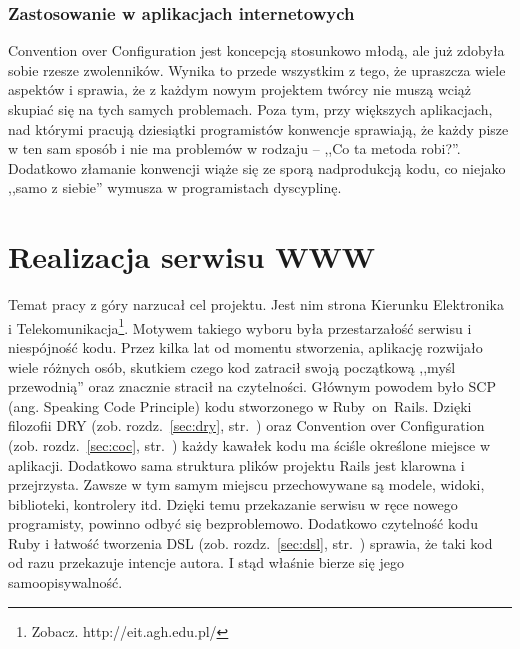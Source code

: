 \documentclass[a4paper,12pt,oneside]{report}
\begin{document}
\subsection{Zastosowanie w aplikacjach internetowych}
\label{coc:web}
Convention over Configuration jest koncepcją stosunkowo młodą, ale już zdobyła sobie rzesze zwolenników. Wynika to przede wszystkim z tego, że upraszcza wiele aspektów i sprawia, że z każdym nowym projektem twórcy nie muszą wciąż skupiać się na tych samych problemach. Poza tym, przy większych aplikacjach, nad którymi pracują dziesiątki programistów konwencje sprawiają, że każdy pisze w ten sam sposób i nie ma problemów w rodzaju -- ,,Co ta metoda robi?''. Dodatkowo złamanie konwencji wiąże się ze sporą nadprodukcją kodu, co niejako ,,samo z siebie'' wymusza w programistach dyscyplinę.

\chapter{Realizacja serwisu WWW}
\label{cha:app}
Temat pracy z góry narzucał cel projektu. Jest nim strona Kierunku Elektronika i Telekomunikacja\footnote{Zobacz. http://eit.agh.edu.pl/}. Motywem takiego wyboru była przestarzałość serwisu i niespójność kodu. Przez kilka lat od momentu stworzenia, aplikację rozwijało wiele różnych osób, skutkiem czego kod zatracił swoją początkową ,,myśl przewodnią'' oraz znacznie stracił na czytelności. Głównym powodem było SCP (ang. Speaking Code Principle) kodu stworzonego w Ruby~on~Rails. Dzięki filozofii DRY (zob. rozdz.~\ref{sec:dry}, str.~\pageref{sec:dry}) oraz Convention over Configuration (zob. rozdz.~\ref{sec:coc}, str.~\pageref{sec:coc}) każdy kawałek kodu ma ściśle określone miejsce w aplikacji. Dodatkowo sama struktura plików projektu Rails jest klarowna i przejrzysta. Zawsze w tym samym miejscu przechowywane są modele, widoki, biblioteki, kontrolery itd. Dzięki temu przekazanie serwisu w ręce nowego programisty, powinno odbyć się bezproblemowo. Dodatkowo czytelność kodu Ruby i łatwość tworzenia DSL (zob. rozdz.~\ref{sec:dsl}, str.~\pageref{sec:dsl}) sprawia, że taki kod od razu przekazuje intencje autora. I stąd właśnie bierze się jego samoopisywalność.
\end{document}
